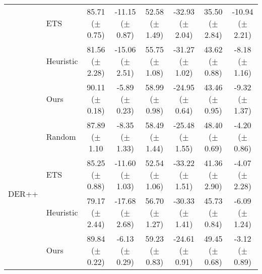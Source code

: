 \begin{table}[t]
{\begin{tabular}{l l c c c c c c}
         & ETS & 85.71 ($\pm$ 0.75) & -11.15 ($\pm$ 0.87) & 52.58 ($\pm$ 1.49) & -32.93 ($\pm$ 2.04) & 35.50  ($\pm$ 2.84) & -10.94  ($\pm$ 2.21) \\
         & Heuristic & 81.56 ($\pm$ 2.28) & -15.06 ($\pm$ 2.51) & 55.75 ($\pm$ 1.08) & -31.27 ($\pm$ 1.02) & 43.62 ($\pm$ 0.88) & -8.18 ($\pm$ 1.16) \\
         & Ours & 90.11 ($\pm$ 0.18) & -5.89 ($\pm$ 0.23) & 58.99 ($\pm$ 0.98) & -24.95 ($\pm$ 0.64) & 43.46  ($\pm$ 0.95) & -9.32  ($\pm$ 1.37) \\
        \midrule
        \multirow{4}{*}{DER++} & Random & 87.89 ($\pm$ 1.10& -8.35 ($\pm$ 1.33) & 58.49  ($\pm$ 1.44) & -25.48  ($\pm$ 1.55) & 48.40  ($\pm$ 0.69) & -4.20  ($\pm$ 0.86) \\
         & ETS & 85.25 ($\pm$ 0.88) & -11.60 ($\pm$ 1.03) & 52.54  ($\pm$ 1.06) & -33.22  ($\pm$ 1.51) & 41.36  ($\pm$ 2.90) & -4.07  ($\pm$ 2.28) \\
         & Heuristic & 79.17 ($\pm$ 2.44) & -17.68 ($\pm$ 2.68) & 56.70 ($\pm$ 1.27) & -30.33 ($\pm$ 1.41) & 45.73 ($\pm$ 0.84) & -6.09 ($\pm$ 1.24) \\
         & Ours & 89.84 ($\pm$ 0.22) & -6.13 ($\pm$ 0.29) & 59.23  ($\pm$ 0.83) & -24.61  ($\pm$ 0.91) & 49.45  ($\pm$ 0.68) & -3.12  ($\pm$ 0.89) \\
        \bottomrule
    \end{tabular}
    }
    \vspace{-2mm}
    \label{tab:bwt_sota_models_applied_to_rsmcts}
\end{table}


